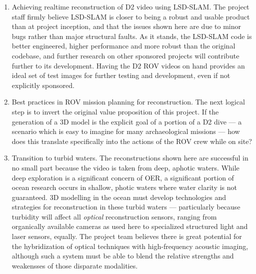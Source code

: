 \documentclass[letterpaper,12pt]{article}
\begin{document}
\begin{enumerate}
    \item Achieving realtime reconstruction of D2 video using LSD-SLAM.   The project staff firmly believe LSD-SLAM is closer to being a robust and usable product than at project inception, and that the issues shown here are due to minor bugs rather than major structural faults.   As it stands, the LSD-SLAM code is better engineered, higher performance and more robust than the original codebase, and further research on other sponsored projects will contribute further to its development.   Having the D2 ROV videos on hand provides an ideal set of test images for further testing and development, even if not explicitly sponsored.
    
    \item Best practices in ROV mission planning for reconstruction.   The next logical step is to invert the original value proposition of this project.   If the generation of a 3D model is the explicit goal of a portion of a D2 dive --- a scenario which is easy to imagine for many archaeological missions --- how does this translate specifically into the actions of the ROV crew while on site?
    
    \item Transition to turbid waters.  The reconstructions shown here are successful in no small part because the video is taken from deep, aphotic waters.   While deep exploration is a significant concern of OER, a significant portion of ocean research occurs in shallow, photic waters where water clarity is not guaranteed.   3D modelling in the ocean must develop technologies and strategies for reconstruction in these turbid waters --- particularly because turbidity will affect all \textit{optical} reconstruction sensors, ranging from organically available cameras as used here to specialized structured light and laser sensors, equally.   The project team believes there is great potential for the hybridization of optical techniques with high-frequency acoustic imaging, although such a system must be able to blend the relative strengths and weakensses of those disparate modalities. 
\end{enumerate}








\end{document}
